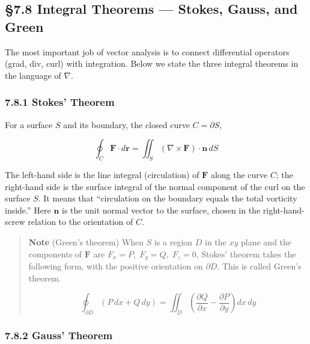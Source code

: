 \documentclass[a4paper,12pt,openany]{book}
\begin{document}
\par\vspace{0.35em}\par

\hypertarget{integral-theorems-stokes-gauss-and-green}{%
\subsection{§7.8 Integral Theorems — Stokes, Gauss, and
Green}\label{integral-theorems-stokes-gauss-and-green}}

The most important job of vector analysis is to connect differential
operators (grad, div, curl) with integration. Below we state the three
integral theorems in the language of \(\nabla\).

\hypertarget{stokes-theorem}{%
\subsubsection{7.8.1 Stokes' Theorem}\label{stokes-theorem}}

For a surface \(S\) and its boundary, the closed curve
\(C = \partial S\),

\[\oint_C \mathbf{F} \cdot d\mathbf{r} = \iint_S (\nabla \times \mathbf{F}) \cdot \mathbf{n}\,dS\]

The left-hand side is the line integral (circulation) of \(\mathbf{F}\)
along the curve \(C\); the right-hand side is the surface integral of
the normal component of the curl on the surface \(S\). It means that
``circulation on the boundary equals the total vorticity inside.'' Here
\(\mathbf{n}\) is the unit normal vector to the surface, chosen in the
right-hand-screw relation to the orientation of \(C\).

\begin{quote}
\textbf{Note} (Green's theorem) When \(S\) is a region \(D\) in the
\(xy\) plane and the components of \(\mathbf{F}\) are
\(F_x=P,\;F_y=Q,\;F_z=0\), Stokes' theorem takes the following form,
with the positive orientation on \(\partial D\). This is called Green's
theorem.

\[\oint_{\partial D} (P\,dx + Q\,dy) = \iint_D \left(\frac{\partial Q}{\partial x} - \frac{\partial P}{\partial y}\right) dx\,dy\]
\end{quote}

\hypertarget{gauss-theorem-1}{%
\subsubsection{7.8.2 Gauss' Theorem}\label{gauss-theorem-1}}
\end{document}
